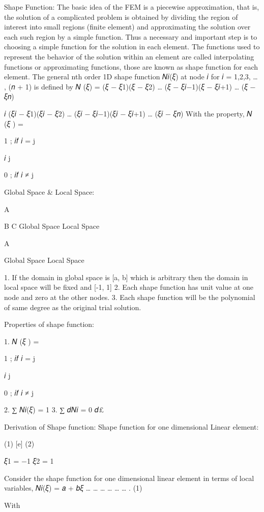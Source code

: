 Shape Function:
The basic idea of the FEM is a piecewise approximation, that is, the solution of a complicated problem is obtained by dividing the region of interest into small regions (finite element) and approximating the solution over each such region by a simple function. Thus a necessary and important step is to choosing a simple function for the solution in each element. The functions used to represent the behavior of the solution within an element are called interpolating functions or approximating functions, those are known as shape function for each element.
The general nth order 1D shape function 𝑁𝑖(𝜉) at node 𝑖 for 𝑖 = 1,2,3, … , (𝑛 + 1) is defined by
𝑁 (𝜉) =	(𝜉 − 𝜉1)(𝜉 − 𝜉2) … (𝜉 − 𝜉𝑖−1)(𝜉 − 𝜉𝑖+1) … (𝜉 − 𝜉𝑛)
 
𝑖	(𝜉𝑖 − 𝜉1)(𝜉𝑖 − 𝜉2) … (𝜉𝑖 − 𝜉𝑖−1)(𝜉𝑖 − 𝜉𝑖+1) … (𝜉𝑖 − 𝜉𝑛)
With the property,	𝑁 (𝜉 ) = {1	;  𝑖𝑓	𝑖 = j
 
𝑖	j
 
0 ; 𝑖𝑓 𝑖 ≠ j
 
Global Space & Local Space:


A




B	C
Global Space	Local Space




A







Global Space	Local Space
 
1.	If the domain in global space is [a, b] which is arbitrary then the domain in local space will be fixed and [-1, 1]
2.	Each shape function has unit value at one node and zero at the other nodes.
3.	Each shape function will be the polynomial of same degree as the original trial solution.


Properties of shape function:

1.	𝑁 (𝜉 ) = {1	;  𝑖𝑓	𝑖 = j
 
𝑖	j
 
0 ; 𝑖𝑓 𝑖 ≠ j
 
2.	∑ 𝑁𝑖(𝜉) = 1
3.	∑ 𝑑𝑁𝑖 = 0
𝑑£


Derivation of Shape function:
Shape function for one dimensional Linear element:


(1)	[e]	(2)

𝜉1 = −1	𝜉2 = 1


Consider the shape function for one dimensional linear element in terms of local variables,
𝑁𝑖(𝜉) = 𝑎 + 𝑏𝜉	… … … … … … . (1)

 
With
 

}}
